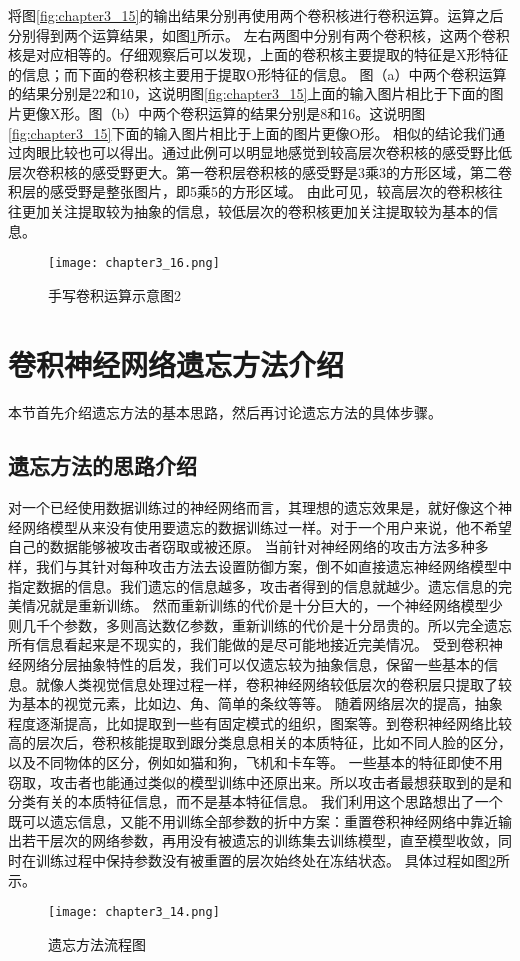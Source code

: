 将图\ref{fig:chapter3_15}的输出结果分别再使用两个卷积核进行卷积运算。运算之后分别得到两个运算结果，如图\ref{fig:chapter3_16}所示。
左右两图中分别有两个卷积核，这两个卷积核是对应相等的。仔细观察后可以发现，上面的卷积核主要提取的特征是X形特征的信息；而下面的卷积核主要用于提取O形特征的信息。
图（a）中两个卷积运算的结果分别是22和10，这说明图\ref{fig:chapter3_15}上面的输入图片相比于下面的图片更像X形。图（b）中两个卷积运算的结果分别是8和16。这说明图\ref{fig:chapter3_15}下面的输入图片相比于上面的图片更像O形。
相似的结论我们通过肉眼比较也可以得出。通过此例可以明显地感觉到较高层次卷积核的感受野比低层次卷积核的感受野更大。第一卷积层卷积核的感受野是3乘3的方形区域，第二卷积层的感受野是整张图片，即5乘5的方形区域。
由此可见，较高层次的卷积核往往更加关注提取较为抽象的信息，较低层次的卷积核更加关注提取较为基本的信息。
\begin{figure}
    \centering
    \texttt{[image: chapter3\_16.png]}
    \caption{手写卷积运算示意图2}
    \label{fig:chapter3_16}
\end{figure}

\section{卷积神经网络遗忘方法介绍}
本节首先介绍遗忘方法的基本思路，然后再讨论遗忘方法的具体步骤。
\subsection{遗忘方法的思路介绍}
对一个已经使用数据训练过的神经网络而言，其理想的遗忘效果是，就好像这个神经网络模型从来没有使用要遗忘的数据训练过一样。对于一个用户来说，他不希望自己的数据能够被攻击者窃取或被还原。
当前针对神经网络的攻击方法多种多样，我们与其针对每种攻击方法去设置防御方案，倒不如直接遗忘神经网络模型中指定数据的信息。我们遗忘的信息越多，攻击者得到的信息就越少。遗忘信息的完美情况就是重新训练。
然而重新训练的代价是十分巨大的，一个神经网络模型少则几千个参数，多则高达数亿参数，重新训练的代价是十分昂贵的。所以完全遗忘所有信息看起来是不现实的，我们能做的是尽可能地接近完美情况。
受到卷积神经网络分层抽象特性的启发，我们可以仅遗忘较为抽象信息，保留一些基本的信息。就像人类视觉信息处理过程一样，卷积神经网络较低层次的卷积层只提取了较为基本的视觉元素，比如边、角、简单的条纹等等。
随着网络层次的提高，抽象程度逐渐提高，比如提取到一些有固定模式的组织，图案等。到卷积神经网络比较高的层次后，卷积核能提取到跟分类息息相关的本质特征，比如不同人脸的区分，以及不同物体的区分，例如如猫和狗，飞机和卡车等。
一些基本的特征即使不用窃取，攻击者也能通过类似的模型训练中还原出来。所以攻击者最想获取到的是和分类有关的本质特征信息，而不是基本特征信息。
我们利用这个思路想出了一个既可以遗忘信息，又能不用训练全部参数的折中方案：重置卷积神经网络中靠近输出若干层次的网络参数，再用没有被遗忘的训练集去训练模型，直至模型收敛，同时在训练过程中保持参数没有被重置的层次始终处在冻结状态。
具体过程如图\ref{fig:chapter3_14}所示。
\begin{figure}
    \centering
    \texttt{[image: chapter3\_14.png]}
    \caption{遗忘方法流程图}
    \label{fig:chapter3_14}
\end{figure}

